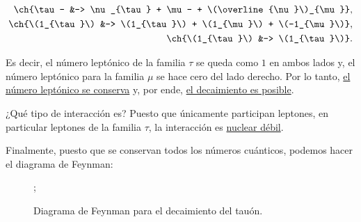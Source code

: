 \documentclass[./../main.tex]{subfiles}
\begin{document}
\begin{exercise}
\begin{solution}
            \begin{align*}
                \ch{\tau- &-> \nu_{\tau} + \mu- + \(\overline{\nu}\)_{\mu}},\\
                \ch{\(1_{\tau}\) &-> \(1_{\tau}\) + \(1_{\mu}\) + \(-1_{\mu}\)},\\
                \ch{\(1_{\tau}\) &-> \(1_{\tau}\)}.\\
            \end{align*}

            Es decir, el número leptónico de la familia \(\tau\) se queda como \(1\) en ambos lados y, el número leptónico para la familia \(\mu\) se hace cero del lado derecho. Por lo tanto, \ul{el número leptónico se conserva} y, por ende, \ul{el decaimiento es posible}. 

            ¿Qué tipo de interacción es? Puesto que únicamente participan leptones, en particular leptones de la familia \(\tau\), la interacción es \ul{nuclear débil}.
            
            Finalmente, puesto que se conservan todos los números cuánticos, podemos hacer el diagrama de Feynman:

            \begin{figure}[htb]
                \centering
                ;
                \caption{Diagrama de Feynman para el decaimiento del tauón.}
                \label{fig:tauon-decay}
            \end{figure}
        \end{solution}
    \end{exercise}
\end{document}
